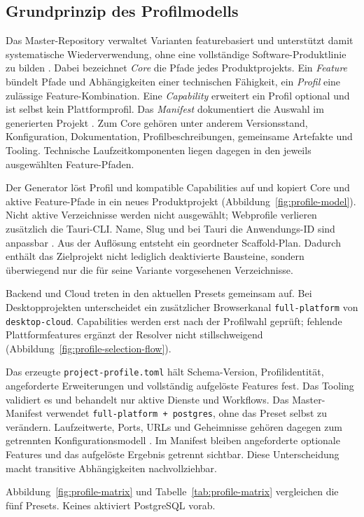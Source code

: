 \subsection{Grundprinzip des Profilmodells}
\label{subsec:grundprinzip-profilmodell}

Das Master-Repository verwaltet Varianten featurebasiert und unterstützt damit
systematische Wiederverwendung, ohne eine vollständige Software-Produktlinie
zu bilden
\parencite{clements2001software-product-lines,krueger1992software-reuse}.
Dabei bezeichnet \emph{Core} die Pfade jedes Produktprojekts. Ein
\emph{Feature} bündelt Pfade und Abhängigkeiten einer technischen Fähigkeit,
ein \emph{Profil} eine zulässige Feature-Kombination. Eine \emph{Capability}
erweitert ein Profil optional und ist selbst kein Plattformprofil. Das
\emph{Manifest} dokumentiert die Auswahl im generierten Projekt
\parencite{kleiveist2026profiles,kleiveist2026template}.
Zum Core gehören unter anderem Versionsstand, Konfiguration, Dokumentation,
Profilbeschreibungen, gemeinsame Artefakte und Tooling. Technische
Laufzeitkomponenten liegen dagegen in den jeweils ausgewählten Feature-Pfaden.



Der Generator löst Profil und kompatible Capabilities auf und kopiert Core und
aktive Feature-Pfade in ein neues Produktprojekt
(Abbildung~\ref{fig:profile-model}). Nicht aktive Verzeichnisse werden nicht
ausgewählt; Webprofile verlieren zusätzlich die Tauri-CLI. Name, Slug und bei
Tauri die Anwendungs-ID sind anpassbar
\parencite{kleiveist2026profiles,kleiveist2026tooling}.
Aus der Auflösung entsteht ein geordneter Scaffold-Plan. Dadurch enthält das
Zielprojekt nicht lediglich deaktivierte Bausteine, sondern überwiegend nur die
für seine Variante vorgesehenen Verzeichnisse.

Backend und Cloud treten in den aktuellen Presets gemeinsam auf. Bei
Desktopprojekten unterscheidet ein zusätzlicher Browserkanal
\texttt{full-platform} von \texttt{desktop-cloud}. Capabilities werden erst
nach der Profilwahl geprüft; fehlende Plattformfeatures ergänzt der Resolver
nicht stillschweigend (Abbildung~\ref{fig:profile-selection-flow}).



Das erzeugte \texttt{project-profile.toml} hält Schema-Version,
Profilidentität, angeforderte Erweiterungen und vollständig aufgelöste Features
fest. Das Tooling validiert es und behandelt nur aktive Dienste und Workflows.
Das Master-Manifest verwendet \texttt{full-platform + postgres}, ohne das
Preset selbst zu verändern. Laufzeitwerte, Ports, URLs und Geheimnisse gehören
dagegen zum getrennten Konfigurationsmodell
\parencite{kleiveist2026configuration,kleiveist2026template}.
Im Manifest bleiben angeforderte optionale Features und das aufgelöste Ergebnis
getrennt sichtbar. Diese Unterscheidung macht transitive Abhängigkeiten
nachvollziehbar.

Abbildung~\ref{fig:profile-matrix} und Tabelle~\ref{tab:profile-matrix}
vergleichen die fünf Presets. Keines aktiviert PostgreSQL vorab.



